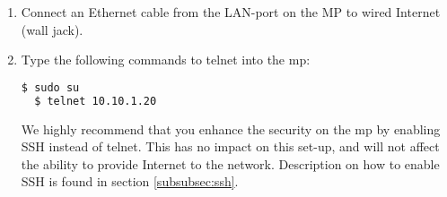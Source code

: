 \begin{enumerate}
\begin{enumerate}
\item In the field BSSID enter "02:CA:FF:EE:BA:BE", like shown in .
\item Under the tab "\gls{ipv4} Settings" choose "Manual" under the Method drop-down menu, like shown in . 
\item Then press "Add" on the same page. Enter the following parameters, like shown in :
\begin{description}
\item[] \textbf{Address:} 10.10.1.245
\item[] \textbf{Netmask:} 24
\item[] \textbf{Gateway:} 10.130.1.1
\end{description}
\begin{figure}[h!]
        \centering
        \begin{subfigure}[t]{0.49\textwidth}
                \texttt{[image: bssid.PNG]}
                \caption{\textbf{The correct BSSID set.}}\label{fig:bssid}
        \end{subfigure}
        \begin{subfigure}[t]{0.49\textwidth}
                \texttt{[image: ipv4settings.PNG]}
                \caption{\textbf{The correct parameters set under IPv4 settings.}}\label{fig:ipv4settings}
        \end{subfigure}
\caption{"Edit Connections" settings on Linux}
\end{figure}
\item Press "Save" on the "Editing vt-mesh"-window, and then "Close" on the "Network Connections"-window. 
\item Then choose "vt-mesh" from the list of available networks. This list is found after pressing the WiFi symbol in the top right corner on your screen. The PC should then be connected to the MP via WiFi. 
\end{enumerate}
\item Connect an Ethernet cable from the LAN-port on the MP to wired Internet (wall jack).
\item Type the following commands to telnet into the \gls{mp}:
\noindent
\begin{lstlisting}[language=bash]
  $ sudo su
  $ telnet 10.10.1.20
\end{lstlisting}
We highly recommend that you enhance the security on the \gls{mp} by enabling SSH instead of telnet. This has no impact on this set-up, and will not affect the ability to provide Internet to the network. Description on how to enable SSH is found in section \ref{subsubsec:ssh}.

\end{enumerate}
